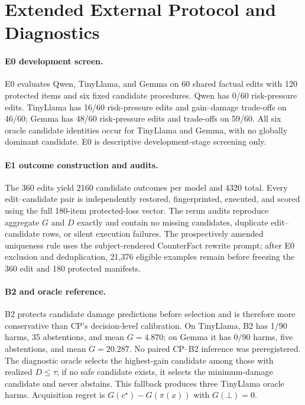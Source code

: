 \documentclass{article} %
\begin{document}
\section{Extended External Protocol and Diagnostics}
\label{app:external_details}

\paragraph{E0 development screen.}
E0 evaluates Qwen, TinyLlama, and Gemma on 60 shared factual edits with 120
protected items and six fixed candidate procedures. Qwen has 0/60 risk-pressure
edits. TinyLlama has 16/60 risk-pressure edits and gain--damage trade-offs on
46/60; Gemma has 48/60 risk-pressure edits and trade-offs on 59/60. All six
oracle candidate identities occur for TinyLlama and Gemma, with no globally
dominant candidate. E0 is descriptive development-stage screening only.

\paragraph{E1 outcome construction and audits.}
The 360 edits yield 2160 candidate outcomes per model and 4320 total. Every
edit--candidate pair is independently restored, fingerprinted, executed, and
scored using the full 180-item protected-loss vector. The rerun audits reproduce
aggregate $G$ and $D$ exactly and contain no missing candidates, duplicate
edit--candidate rows, or silent execution failures. The prospectively amended
uniqueness rule uses the subject-rendered CounterFact rewrite prompt; after E0
exclusion and deduplication, 21,376 eligible examples remain before freezing
the 360 edit and 180 protected manifests.

\paragraph{B2 and oracle reference.}
B2 protects candidate damage predictions before selection and is therefore
more conservative than CP's decision-level calibration. On TinyLlama, B2 has
1/90 harms, 35 abstentions, and mean $G=4.870$; on Gemma it has 0/90 harms,
five abstentions, and mean $G=20.287$. No paired CP--B2 inference was
preregistered. The diagnostic oracle selects the highest-gain candidate among
those with realized $D\leq\tau$; if no safe candidate exists, it selects the
minimum-damage candidate and never abstains. This fallback produces three
TinyLlama oracle harms. Acquisition regret is $G(c^\star)-G(\pi(x))$ with
$G(\bot)=0$.
\end{document}
